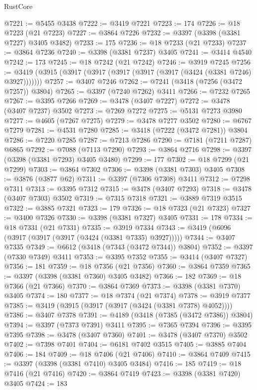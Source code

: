 \begin{lexlean}{RustCore}
\begin{coremodule}
@7221 := @5455 @3438
@7222 := @3419 @7221
@7223 := 174
@7226 := @18 @7223 (@21 @7223)
@7227 := @3864 @7226
@7232 := @3397 (@3398 (@3381 @7227) @3405 @3482)
@7233 := 175
@7236 := @18 @7233 (@21 @7233)
@7237 := @3864 @7236
@7240 := @3398 (@3381 @7237) @3405
@7241 := @3414 @4540
@7242 := 173
@7245 := @18 @7242 (@21 @7242)
@7246 := @3919 @7245
@7256 := @3419 (@3915 (@3917 (@3917 (@3917 (@3917 (@3917 (@3424 (@3381 @7246) @3927)))))))
@7257 := @3407 @7246
@7262 := @7241 (@3418 (@7256 (@3472 @7257)) @3804)
@7265 := @3397 (@7240 @7262) @3411
@7266 := @7232 @7265
@7267 := @3395 @7266
@7269 := @3478 (@3407 @7227)
@7272 := @3478 (@3407 @7237) @3502
@7273 := @7269 @7272
@7275 := @5131 @7273 @3980
@7277 := @4605 (@7267 @7275)
@7279 := @3478 @7277 @3502
@7280 := @6767 @7279
@7281 := @4531 @7280
@7285 := @3418 (@7222 (@3472 @7281)) @3804
@7286 := @7220 @7285
@7287 := @7213 @7286
@7290 := @7181 (@7211 @7287) @6865
@7292 := @7088 (@7113 @7290)
@7293 := @3864 @2716
@7298 := @3397 (@3398 (@3381 @7293) @3405 @3480)
@7299 := 177
@7302 := @18 @7299 (@21 @7299)
@7303 := @3864 @7302
@7306 := @3398 (@3381 @7303) @3405
@7308 := @3876 (@3877 @62)
@7311 := @3397 (@7306 @7308) @3411
@7312 := @7298 @7311
@7313 := @3395 @7312
@7315 := @3478 (@3407 @7293)
@7318 := @3478 (@3407 @7303) @3502
@7319 := @7315 @7318
@7321 := @3889 @7319 @3515
@7322 := @3885 @7321
@7323 := 179
@7326 := @18 @7323 (@21 @7323)
@7327 := @3400 @7326
@7330 := @3398 (@3381 @7327) @3405
@7331 := 178
@7334 := @18 @7331 (@21 @7331)
@7335 := @3919 @7334
@7343 := @3419 (@6096 (@3917 (@3917 (@3917 (@3424 (@3381 @7335) @3927)))))
@7344 := @3407 @7335
@7349 := @6612 (@3418 (@7343 (@3472 @7344)) @3804)
@7352 := @3397 (@7330 @7349) @3411
@7353 := @3395 @7352
@7355 := @3414 (@3407 @7327)
@7356 := 181
@7359 := @18 @7356 (@21 @7356)
@7360 := @3864 @7359
@7365 := @3397 (@3398 (@3381 @7360) @3405 @3482)
@7366 := 182
@7369 := @18 @7366 (@21 @7366)
@7370 := @3864 @7369
@7373 := @3398 (@3381 @7370) @3405
@7374 := 180
@7377 := @18 @7374 (@21 @7374)
@7378 := @3919 @7377
@7385 := @3419 (@3915 (@3917 (@3917 (@3424 (@3381 @7378) @4052))))
@7386 := @3407 @7378
@7391 := @4189 (@3418 (@7385 (@3472 @7386)) @3804)
@7394 := @3397 (@7373 @7391) @3411
@7395 := @7365 @7394
@7396 := @3395 @7395
@7398 := @3478 (@3407 @7360)
@7401 := @3478 (@3407 @7370) @3502
@7402 := @7398 @7401
@7404 := @6181 @7402 @3515
@7405 := @3885 @7404
@7406 := 184
@7409 := @18 @7406 (@21 @7406)
@7410 := @3864 @7409
@7415 := @3397 (@3398 (@3381 @7410) @3405 @3484)
@7416 := 185
@7419 := @18 @7416 (@21 @7416)
@7420 := @3864 @7419
@7423 := @3398 (@3381 @7420) @3405
@7424 := 183

\end{coremodule}
\end{lexlean}

